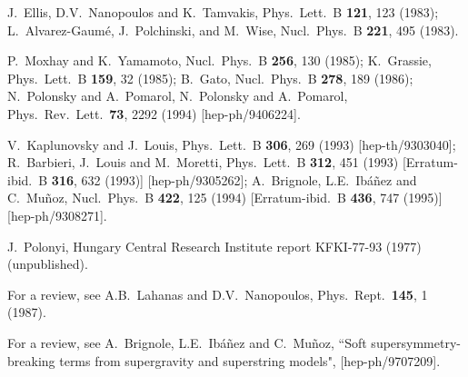\documentclass[11pt]{article}
\def\perspectives{in {\it Perspectives on Supersymmetry}, ed.
G.L.~Kane (World Scientific, 1998)}
\begin{document}
\begin{thebibliography}{999}
J.~Ellis, D.V.~Nanopoulos and K.~Tamvakis,
  Phys.\ Lett.\ B {\bf 121}, 123 (1983);
L.~Alvarez-Gaum\'e, J.~Polchinski, and M.~Wise,
  Nucl.\ Phys.\ B {\bf 221}, 495 (1983).

P.~Moxhay and K.~Yamamoto, 
  Nucl.\ Phys.\ B {\bf 256}, 130 (1985);
K.~Grassie, 
  Phys.\ Lett.\ B {\bf 159}, 32 (1985);
B.~Gato, 
  Nucl.\ Phys.\ B {\bf 278}, 189 (1986);
N.~Polonsky and A.~Pomarol, 
  N.~Polonsky and A.~Pomarol,
  Phys.\ Rev.\ Lett.\  {\bf 73}, 2292 (1994)
  [hep-ph/9406224].


V.~Kaplunovsky and J.~Louis, 
  Phys.\ Lett.\ B {\bf 306}, 269 (1993)
  [hep-th/9303040];
R.~Barbieri, J.~Louis and M.~Moretti, 
  Phys.\ Lett.\ B {\bf 312}, 451 (1993)
  [Erratum-ibid.\ B {\bf 316}, 632 (1993)]
  [hep-ph/9305262];
A.~Brignole, L.E.~Ib\'a\~nez and  C.~Mu\~noz,
  Nucl.\ Phys.\ B {\bf 422}, 125 (1994)
  [Erratum-ibid.\ B {\bf 436}, 747 (1995)]
  [hep-ph/9308271].

 J.~Polonyi, Hungary Central Research Institute
report KFKI-77-93 (1977) (unpublished). 

 For a review, see
A.B.~Lahanas and D.V.~Nanopoulos, 
  Phys.\ Rept.\  {\bf 145}, 1 (1987).

 For a review, see 
A.~Brignole, L.E.~Ib\'a\~nez and C.~Mu\~noz, 
  ``Soft supersymmetry-breaking terms from supergravity and superstring 
  models",
  [hep-ph/9707209].


\end{thebibliography}
\end{document}
